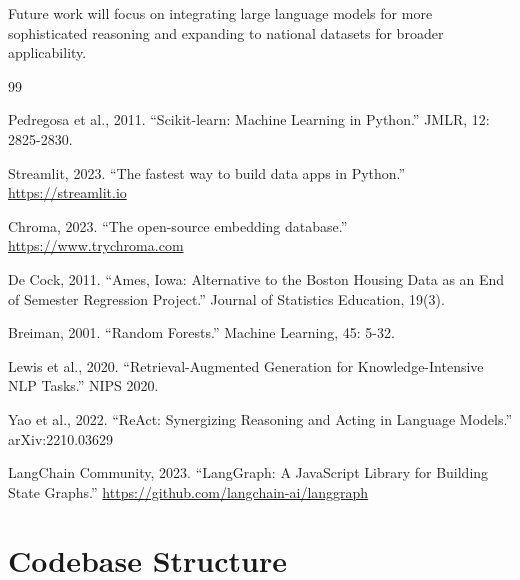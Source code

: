 \documentclass[11pt,a4paper]{article}
\begin{document}
Future work will focus on integrating large language models for more sophisticated reasoning and expanding to national datasets for broader applicability.

\pagebreak

\begin{thebibliography}{99}

 Pedregosa et al., 2011. ``Scikit-learn: Machine Learning in Python.'' JMLR, 12: 2825-2830.

 Streamlit, 2023. ``The fastest way to build data apps in Python.'' \url{https://streamlit.io}

 Chroma, 2023. ``The open-source embedding database.'' \url{https://www.trychroma.com}

 De Cock, 2011. ``Ames, Iowa: Alternative to the Boston Housing Data as an End of Semester Regression Project.'' Journal of Statistics Education, 19(3).

 Breiman, 2001. ``Random Forests.'' Machine Learning, 45: 5-32.

 Lewis et al., 2020. ``Retrieval-Augmented Generation for Knowledge-Intensive NLP Tasks.'' NIPS 2020.

 Yao et al., 2022. ``ReAct: Synergizing Reasoning and Acting in Language Models.'' arXiv:2210.03629

 LangChain Community, 2023. ``LangGraph: A JavaScript Library for Building State Graphs.'' \url{https://github.com/langchain-ai/langgraph}

\end{thebibliography}

\pagebreak

\appendix

\section{Codebase Structure}
\end{document}
